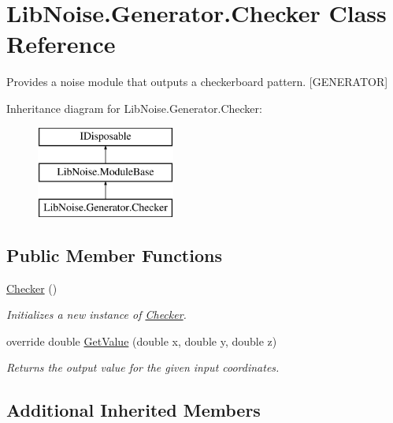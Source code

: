 \hypertarget{class_lib_noise_1_1_generator_1_1_checker}{}\section{Lib\+Noise.\+Generator.\+Checker Class Reference}
\label{class_lib_noise_1_1_generator_1_1_checker}


Provides a noise module that outputs a checkerboard pattern. \mbox{[}G\+E\+N\+E\+R\+A\+T\+OR\mbox{]}  


Inheritance diagram for Lib\+Noise.\+Generator.\+Checker\+:\begin{figure}[H]
\begin{center}
\leavevmode
\includegraphics[height=3.000000cm]{class_lib_noise_1_1_generator_1_1_checker}
\end{center}
\end{figure}
\subsection*{Public Member Functions}
\begin{DoxyCompactItemize}
\item 
\hyperlink{class_lib_noise_1_1_generator_1_1_checker_a7eb7717054d1f266b10174e320da60e2}{Checker} ()
\begin{DoxyCompactList}\small\item\em Initializes a new instance of \hyperlink{class_lib_noise_1_1_generator_1_1_checker}{Checker}. \end{DoxyCompactList}\item 
override double \hyperlink{class_lib_noise_1_1_generator_1_1_checker_a26a849564ad34925c60be7b4529d4263}{Get\+Value} (double x, double y, double z)
\begin{DoxyCompactList}\small\item\em Returns the output value for the given input coordinates. \end{DoxyCompactList}\end{DoxyCompactItemize}
\subsection*{Additional Inherited Members}


